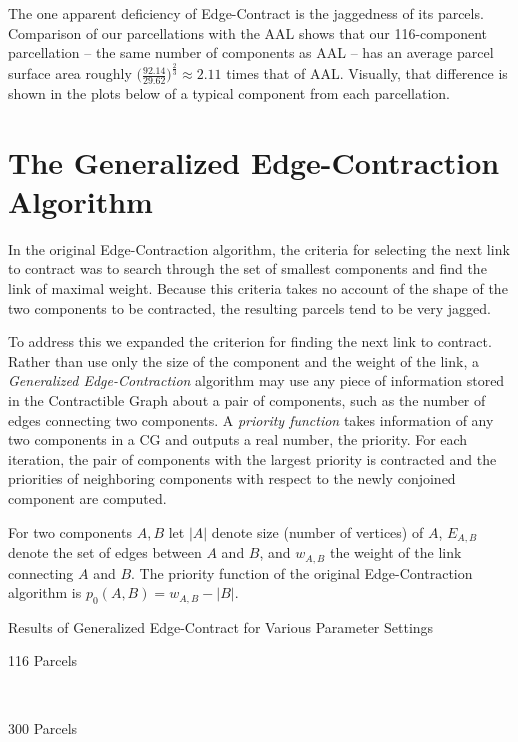 The one apparent deficiency of Edge-Contract is the jaggedness of its
parcels. Comparison of our parcellations with the AAL shows that our
116-component parcellation -- the same number of components as AAL --
has an average parcel surface area roughly
$\big( \frac{92.14}{29.62} \big)^{\frac{2}{3} }\approx 2.11$ times
that of AAL. Visually, that difference is shown in the plots below of
a typical component from each parcellation.


\section{The Generalized Edge-Contraction Algorithm}

In the original Edge-Contraction algorithm, the criteria for selecting
the next link to contract was to search through the set of smallest
components and find the link of maximal weight. Because this criteria
takes no account of the shape of the two components to be contracted,
the resulting parcels tend to be very jagged.

To address this we expanded the criterion for finding the next link
to contract. Rather than use only the size of the component and the
weight of the link, a \textit{Generalized Edge-Contraction} algorithm
may use any piece of information stored in the Contractible Graph about
a pair of components, such as the number of edges connecting two
components. A \textit{priority function} takes information of any two
components in a CG and outputs a real number, the priority. For each
iteration, the pair of components with the largest priority is
contracted and the priorities of neighboring components with respect
to the newly conjoined component are computed.

For two components $A,B$ let $|A|$ denote size (number of vertices)
of $A$, $E_{A,B}$ denote the set of edges between $A$ and $B$, and
$w_{A,B}$ the weight of the link connecting $A$ and $B$.
The priority function of the original Edge-Contraction algorithm
is $p_0(A, B) = w_{A,B} - |B|$.

\begin{table}
\caption{Results of Generalized Edge-Contract for Various Parameter Settings}
\centering
\begin{subtable}[v]{0.5\textwidth}
  
  \caption{116 Parcels}
\end{subtable}
~
\begin{subtable}[v]{0.5\textwidth}
  
  \caption{300 Parcels}
\end{subtable}
\label{gen_ec}
\end{table}

